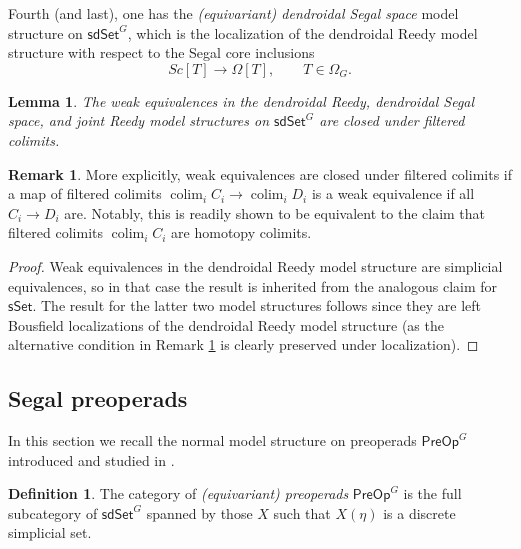 \documentclass[a4paper,10pt
,draft
]{article}%
\numberwithin{equation}{section}
\numberwithin{figure}{section}
\newtheorem{lemma}[equation]{Lemma}%
\theoremstyle{definition} %
\newtheorem{definition}[equation]{Definition}%
\newtheorem{remark}[equation]{Remark}%
\newcommand{\longto}{\longrightarrow}%
\DeclareMathOperator{\colim}{colim}%
\newcommand{\1}{\ensuremath{\mathbbm 1}}%
\begin{document}
Fourth (and last), one has the \textit{(equivariant) dendroidal Segal space} model structure on $\mathsf{sdSet}^G$,
which is the localization of the dendroidal Reedy model structure with respect to the Segal core inclusions
\[
	Sc[T] \longto \Omega[T],
\qquad
	T \in \Omega_G.
\]



\begin{lemma}\label{FCOLIM_WE_LEM}
	The weak equivalences in the dendroidal Reedy, dendroidal Segal space, and joint Reedy model structures 
	on $\mathsf{sdSet}^G$ are closed under filtered colimits.
\end{lemma}


\begin{remark}\label{WEFILRES REM}
	More explicitly, weak equivalences are closed
	under filtered colimits if a map of filtered colimits
	$\colim_i C_i \to \colim_i D_i$
	is a weak equivalence if all $C_i \to D_i$ are.
%	
	Notably, this is readily shown to be equivalent to 
	the claim that filtered colimits
	$\colim_i C_i$ are homotopy colimits.
\end{remark}


\begin{proof}
	Weak equivalences in the dendroidal Reedy model structure are simplicial equivalences, 
	so in that case the result is inherited from the analogous claim for $\mathsf{sSet}$.
%	
	The result for the latter two model structures follows
	since they are left Bousfield localizations of the dendroidal Reedy model structure
	(as the alternative condition in
	Remark \ref{WEFILRES REM}
	is clearly preserved under localization).
\end{proof}






\subsection{Segal preoperads}
\label{SPREOP_SEC}


In this section we recall the normal model structure on preoperads
$\mathsf{PreOp}^G$
introduced and studied in \cite[\S 4 and \S 5]{BP_edss}.

\begin{definition}\label{PREOP DEF} 
	The category of \textit{(equivariant) preoperads} $\mathsf{PreOp}^G$ is the full subcategory of $\mathsf{sdSet}^G$ spanned by those $X$ such that
	$X(\eta)$ is a discrete simplicial set.
\end{definition}
\end{document}
